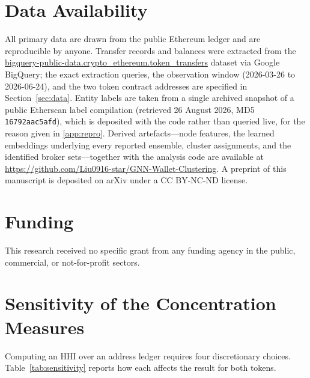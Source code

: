 \documentclass[final,5p,times]{elsarticle}
\begin{document}
\section*{Data Availability}
All primary data are drawn from the public Ethereum ledger and are
reproducible by anyone. Transfer records and balances were extracted from
the \url{bigquery-public-data.crypto_ethereum.token_transfers} dataset
via Google BigQuery; the exact extraction queries, the observation window
(2026-03-26 to 2026-06-24), and the two token contract addresses are
specified in Section~\ref{sec:data}. Entity labels are taken from a
single archived snapshot of a public Etherscan label compilation (retrieved
26 August 2026, MD5 \texttt{16792aac5afd}), which is deposited with the code
rather than queried live, for the reason given in
\ref{app:repro}. Derived artefacts---node features, the learned
embeddings underlying every reported ensemble, cluster assignments, and the
identified broker sets---together with the analysis code are available at
\url{https://github.com/Liu0916-star/GNN-Wallet-Clustering}. A preprint of
this manuscript is deposited on arXiv under a CC BY-NC-ND license.

\section*{Funding}
This research received no specific grant from any funding agency in the
public, commercial, or not-for-profit sectors.

\FloatBarrier
\appendix
\setcounter{table}{0}
\setcounter{figure}{0}
\renewcommand{\thetable}{A.\arabic{table}}
\renewcommand{\thefigure}{A.\arabic{figure}}
\section{Sensitivity of the Concentration Measures}
\label{app:sensitivity}

Computing an HHI over an address ledger requires four discretionary
choices. Table~\ref{tab:sensitivity} reports how each affects the result for
both tokens.
\end{document}
